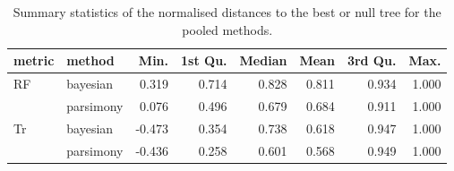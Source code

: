 \begin{table}[ht]
\centering
\begin{tabular}{llrrrrrr}
  \hline
metric & method & Min. & 1st Qu. & Median & Mean & 3rd Qu. & Max. \\ 
  \hline
RF & bayesian & 0.319 & 0.714 & 0.828 & 0.811 & 0.934 & 1.000 \\ 
   & parsimony & 0.076 & 0.496 & 0.679 & 0.684 & 0.911 & 1.000 \\ 
  Tr & bayesian & -0.473 & 0.354 & 0.738 & 0.618 & 0.947 & 1.000 \\ 
   & parsimony & -0.436 & 0.258 & 0.601 & 0.568 & 0.949 & 1.000 \\ 
   \hline
\end{tabular}
\caption{Summary statistics of the normalised distances to the best or null tree for the pooled methods.} 
\label{Tab_pooledmethod}
\end{table}
